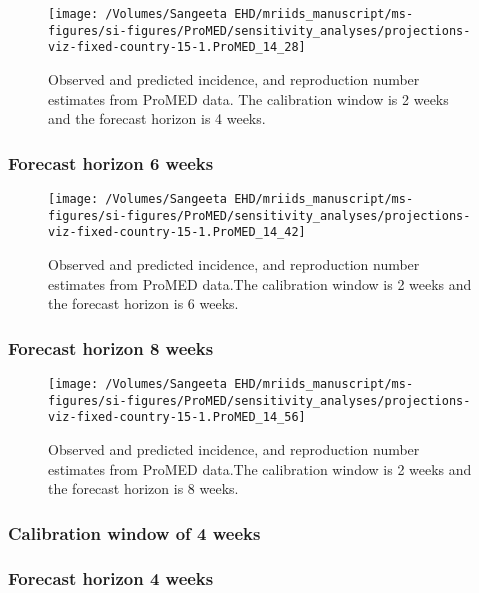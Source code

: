 \documentclass[9pt,twoside,lineno]{pnas-new}
\begin{document}
\begin{figure}
  \centering 
\texttt{[image: /Volumes/Sangeeta EHD/mriids\_manuscript/ms-figures/si-figures/ProMED/sensitivity\_analyses/projections-viz-fixed-country-15-1.ProMED\_14\_28]} 
  \caption{Observed and predicted incidence, and reproduction number
estimates from ProMED data. The calibration window is 2 weeks and the
forecast horizon is 4 weeks.}
\label{fig:pm24ul10}
\end{figure}\FloatBarrier


\subsubsection{Forecast horizon 6 weeks}\label{forecast-horizon-6-weeks-9}

\begin{figure}

  \centering \texttt{[image: /Volumes/Sangeeta EHD/mriids\_manuscript/ms-figures/si-figures/ProMED/sensitivity\_analyses/projections-viz-fixed-country-15-1.ProMED\_14\_42]} 

  \caption{Observed and predicted incidence, and reproduction number
    estimates from ProMED data.The calibration window is 2 weeks and
    the forecast horizon is 6 weeks.}
  \label{fig:pm26ul10}
\end{figure}\FloatBarrier


\subsubsection{Forecast horizon 8 weeks}\label{forecast-horizon-8-weeks-9}

\begin{figure}

  \centering 
\texttt{[image: /Volumes/Sangeeta EHD/mriids\_manuscript/ms-figures/si-figures/ProMED/sensitivity\_analyses/projections-viz-fixed-country-15-1.ProMED\_14\_56]} 
  \caption{Observed and predicted incidence, and reproduction number
    estimates from ProMED data.The calibration window is 2 weeks and
    the forecast horizon is 8 weeks.}
\label{fig:pm28ul10}
\end{figure}\FloatBarrier


\subsubsection{Calibration window of 4 weeks}\label{calibration-window-of-4-weeks-3}
\subsubsection{Forecast horizon 4 weeks}\label{forecast-horizon-4-weeks-9}
\end{document}

